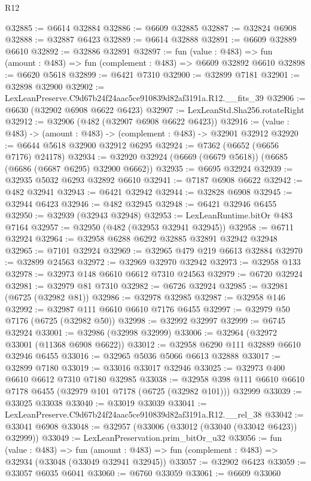 \begin{lexlean}{R12}
\begin{coremodule}
@32885 := @6614 @32884
@32886 := @6609 @32885
@32887 := @32824 @6908
@32888 := @32887 @6423
@32889 := @6614 @32888
@32891 := @6609 @32889 @6610
@32892 := @32886 @32891
@32897 := fun (value : @483) => fun (amount : @483) => fun (complement : @483) => @6609 @32892 @6610
@32898 := @6620 @5618
@32899 := @6421 @7310
@32900 := @32899 @7181
@32901 := @32898 @32900
@32902 := LexLeanPreserve.C9d67b24f24aac5ce910839d82af3191a.R12.__fits_39
@32906 := @6630 (@32902 @6908 @6622 @6423)
@32907 := LexLeanStd.Sha256.rotateRight
@32912 := @32906 (@482 (@32907 @6908 @6622 @6423))
@32916 := (value : @483) -> (amount : @483) -> (complement : @483) -> @32901 @32912
@32920 := @6644 @5618 @32900 @32912 @6295
@32924 := @7362 (@6652 (@6656 @7176) @24178)
@32934 := @32920 @32924 (@6669 (@6679 @5618)) (@6685 (@6686 (@6687 @6295) @32900 @6662))
@32935 := @6695 @32924
@32939 := @32935 @5032 @6293 @32892 @6610
@32941 := @7187 @6908 @6622
@32942 := @482 @32941
@32943 := @6421 @32942
@32944 := @32828 @6908
@32945 := @32944 @6423
@32946 := @482 @32945
@32948 := @6421 @32946 @6455
@32950 := @32939 (@32943 @32948)
@32953 := LexLeanRuntime.bitOr @483 @7164
@32957 := @32950 (@482 (@32953 @32941 @32945))
@32958 := @6711 @32924
@32964 := @32958 @6288 @6292 @32885 @32891 @32942 @32948
@32965 := @7101 @32924
@32969 := @32965 @479 @219 @6613 @32884
@32970 := @32899 @24563
@32972 := @32969 @32970 @32942
@32973 := @32958 @133
@32978 := @32973 @148 @6610 @6612 @7310 @24563
@32979 := @6720 @32924
@32981 := @32979 @81 @7310
@32982 := @6726 @32924
@32985 := @32981 (@6725 (@32982 @81))
@32986 := @32978 @32985
@32987 := @32958 @146
@32992 := @32987 @111 @6610 @6610 @7176 @6455
@32997 := @32979 @50 @7176 (@6725 (@32982 @50))
@32998 := @32992 @32997
@32999 := @6745 @32924
@33001 := @32986 (@32998 @32999)
@33006 := @32964 (@32972 @33001 (@11368 @6908 @6622))
@33012 := @32958 @6290 @111 @32889 @6610 @32946 @6455
@33016 := @32965 @5036 @5066 @6613 @32888
@33017 := @32899 @7180
@33019 := @33016 @33017 @32946
@33025 := @32973 @400 @6610 @6612 @7310 @7180 @32985
@33038 := @32958 @398 @111 @6610 @6610 @7178 @6455 (@32979 @101 @7178 (@6725 (@32982 @101))) @32999
@33039 := @33025 @33038
@33040 := @33019 @33039
@33041 := LexLeanPreserve.C9d67b24f24aac5ce910839d82af3191a.R12.__rel_38
@33042 := @33041 @6908
@33048 := @32957 (@33006 (@33012 (@33040 (@33042 @6423)) @32999))
@33049 := LexLeanPreservation.prim_bitOr_u32
@33056 := fun (value : @483) =>
  fun (amount : @483) => fun (complement : @483) => @32934 (@33048 (@33049 @32941 @32945))
@33057 := @32902 @6423
@33059 := @33057 @6035 @6041
@33060 := @6760 @33059
@33061 := @6609 @33060

\end{coremodule}
\end{lexlean}
